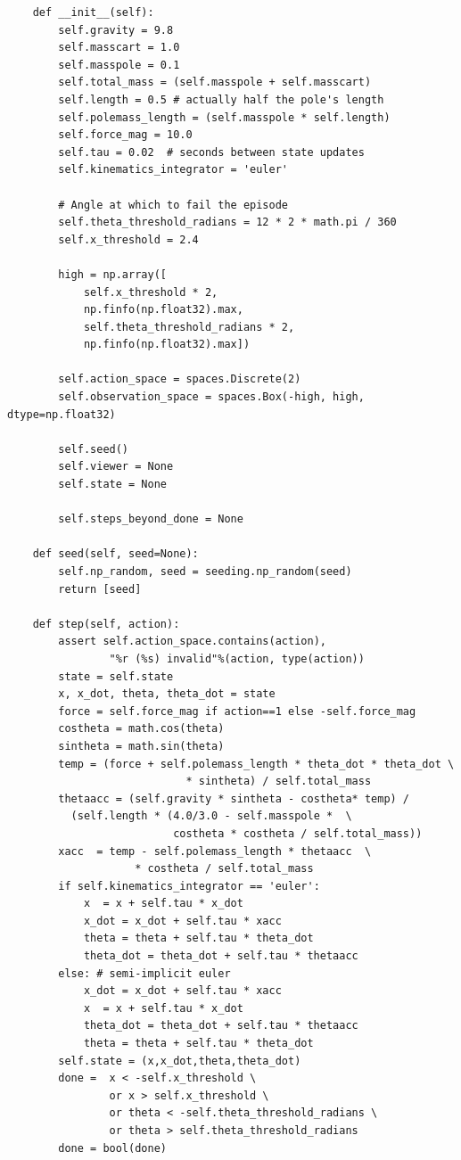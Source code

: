 \documentclass[cic,tc]{iiufrgs}
\newenvironment{longlisting}{\captionsetup{type=listing}}{}
\begin{document}
\begin{longlisting}
\begin{verbatim}
    def __init__(self):
        self.gravity = 9.8
        self.masscart = 1.0
        self.masspole = 0.1
        self.total_mass = (self.masspole + self.masscart)
        self.length = 0.5 # actually half the pole's length
        self.polemass_length = (self.masspole * self.length)
        self.force_mag = 10.0
        self.tau = 0.02  # seconds between state updates
        self.kinematics_integrator = 'euler'

        # Angle at which to fail the episode
        self.theta_threshold_radians = 12 * 2 * math.pi / 360
        self.x_threshold = 2.4

        high = np.array([
            self.x_threshold * 2,
            np.finfo(np.float32).max,
            self.theta_threshold_radians * 2,
            np.finfo(np.float32).max])

        self.action_space = spaces.Discrete(2)
        self.observation_space = spaces.Box(-high, high, dtype=np.float32)

        self.seed()
        self.viewer = None
        self.state = None

        self.steps_beyond_done = None

    def seed(self, seed=None):
        self.np_random, seed = seeding.np_random(seed)
        return [seed]

    def step(self, action):
        assert self.action_space.contains(action),
                "%r (%s) invalid"%(action, type(action))
        state = self.state
        x, x_dot, theta, theta_dot = state
        force = self.force_mag if action==1 else -self.force_mag
        costheta = math.cos(theta)
        sintheta = math.sin(theta)
        temp = (force + self.polemass_length * theta_dot * theta_dot \
                            * sintheta) / self.total_mass
        thetaacc = (self.gravity * sintheta - costheta* temp) /
          (self.length * (4.0/3.0 - self.masspole *  \
                          costheta * costheta / self.total_mass))
        xacc  = temp - self.polemass_length * thetaacc  \
                    * costheta / self.total_mass
        if self.kinematics_integrator == 'euler':
            x  = x + self.tau * x_dot
            x_dot = x_dot + self.tau * xacc
            theta = theta + self.tau * theta_dot
            theta_dot = theta_dot + self.tau * thetaacc
        else: # semi-implicit euler
            x_dot = x_dot + self.tau * xacc
            x  = x + self.tau * x_dot
            theta_dot = theta_dot + self.tau * thetaacc
            theta = theta + self.tau * theta_dot
        self.state = (x,x_dot,theta,theta_dot)
        done =  x < -self.x_threshold \
                or x > self.x_threshold \
                or theta < -self.theta_threshold_radians \
                or theta > self.theta_threshold_radians
        done = bool(done)


\end{verbatim}
\end{longlisting}
\end{document}
